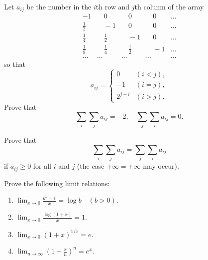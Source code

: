   \begin{exercise}[Rudin 8.2]
    Let $a_{ij}$ be the number in the $i$th row and $j$th column of the array
    \begin{align*}
      -1 & \quad 0 & \quad 0 & \quad 0 & \dots \\
      \frac{1}{2} & \quad -1 & \quad 0 & \quad 0 & \dots \\
      \frac{1}{4} & \quad \frac{1}{2} & \quad -1 & \quad 0 & \dots \\
      \frac{1}{8} & \quad \frac{1}{4} & \quad \frac{1}{2} & \quad -1 & \dots \\
      \dots & \dots & \dots & \dots & \dots
    \end{align*}
    so that
    \begin{equation}
      a_{ij} = \begin{cases} 0 & (i < j), \\ -1 & (i = j), \\ 2^{j-i} & (i > j). \end{cases}
    \end{equation}
    Prove that
    \begin{equation}
      \sum_i \sum_j a_{ij} = -2, \quad \sum_j \sum_i a_{ij} = 0.
    \end{equation}
  \end{exercise}
  \begin{solution}

  \end{solution}

  \begin{exercise}[Rudin 8.3]
    Prove that
    \begin{equation}
      \sum_i \sum_j a_{ij} = \sum_j \sum_i a_{ij}
    \end{equation}
    if $a_{ij} \geq 0$ for all $i$ and $j$ (the case $+\infty = +\infty$ may occur).
  \end{exercise}
  \begin{solution}

  \end{solution}

  \begin{exercise}[Rudin 8.4]
    Prove the following limit relations:
    \begin{enumerate}
      \item $\lim_{x \to 0} \frac{b^x - 1}{x} = \log b \quad (b > 0)$.
      \item $\lim_{x \to 0} \frac{\log (1+x)}{x} = 1$.
      \item $\lim_{x \to 0} (1+x)^{1/x} = e$.
      \item $\lim_{n \to \infty} (1 + \frac{x}{n})^n = e^x$.
    \end{enumerate}
  \end{exercise}
  \begin{solution}

  \end{solution}


